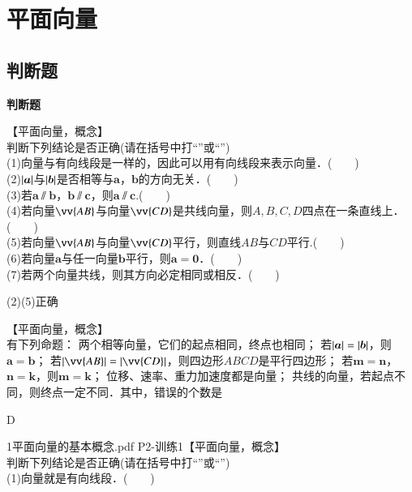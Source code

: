 \section{平面向量}
  \subsection{判断题}
  \begin{exercise}{\textbf{判断题}}
    \item 【平面向量，概念】\\
      判断下列结论是否正确(请在括号中打“\checkmark”或“\XSolidBrush”)\\
      (1)向量与有向线段是一样的，因此可以用有向线段来表示向量．(　　)\\
      (2)$\left| \bm{a} \right|$与$\left| \bm{b} \right|$是否相等与$\bm{a}$，$\bm{b}$的方向无关．(　　)\\
      (3)若$\bm{a}\varparallel\bm{b}$，$\bm{b}\varparallel\bm{c}$，则$\bm{a}\varparallel\bm{c}$.(　　)\\
      (4)若向量$\vv{AB}$与向量$\vv{CD}$是共线向量，则$A,B,C,D$四点在一条直线上．(　　)\\
      (5)若向量$\vv{AB}$与向量$\vv{CD}$平行，则直线$AB$与$CD$平行.(　　)\\
      (6)若向量$\bm a$与任一向量$\bm b$平行，则$\bm a=\bm 0$．(　　)\\
      (7)若两个向量共线，则其方向必定相同或相反．(　　)
      \begin{answer}
        (2)(5)正确
      \end{answer}
    \item 【平面向量，概念】\\
      有下列命题：
      两个相等向量，它们的起点相同，终点也相同；
      若$\left| \bm{a} \right|=\left| \bm{b} \right|$，则$\bm{a}=\bm{b}$；
      若$\abs{\vv{AB}}=\abs{\vv{CD}}$，则四边形$ABCD$是平行四边形；
      若$\bm{m}=\bm{n}$，$\bm{n}=\bm{k}$，则$\bm{m}=\bm{k}$；
      位移、速率、重力加速度都是向量；
      共线的向量，若起点不同，则终点一定不同．其中，错误的个数是\xz
      \begin{answer}
        D
      \end{answer}
    \item 1平面向量的基本概念.pdf P2-训练1【平面向量，概念】\\
      判断下列结论是否正确(请在括号中打“\checkmark”或“\XSolidBrush”)\\
      (1)向量就是有向线段．(　　)\\

\end{exercise}
